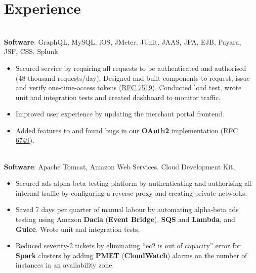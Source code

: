 \section{Experience}
\\
\textbf{Software}: GraphQL, MySQL, iOS, JMeter, JUnit, JAAS, JPA, EJB, Payara, JSF, CSS, Splunk

\begin{itemize}[leftmargin=*]
    \item {
        Secured service by requiring all requests to be authenticated and authorised (48 thousand requests/day). Designed and built components to request, issue and verify one-time-access tokens (\href{https://datatracker.ietf.org/doc/html/rfc7519}{RFC 7519}). Conducted load test, wrote unit and integration tests and created dashboard to monitor traffic.
    }
    \item {
        Improved user experience by updating the merchant portal frontend.
    }
    \item {
        Added features to and found bugs in our \textbf{OAuth2} implementation (\href{https://datatracker.ietf.org/doc/html/rfc6749}{RFC 6749}).
    }
\end{itemize}

\\
\textbf{Software}: Apache Tomcat, Amazon Web Services, Cloud Development Kit, 

\begin{itemize}[leftmargin=*]
    \item {
        Secured ads alpha-beta testing platform by authenticating and authorising all internal traffic by configuring a reverse-proxy and creating private networks.
    }
    \item {
        Saved 7 days per quarter of manual labour by automating alpha-beta ads testing using Amazon \textbf{Dacia} (\textbf{Event Bridge}), \textbf{SQS} and \textbf{Lambda}, and \textbf{Guice}. Wrote unit and integration tests.
    }
    \item {
        Reduced severity-2 tickets by eliminating “ec2 is out of capacity” error for \textbf{Spark} clusters by adding \textbf{PMET} (\textbf{CloudWatch}) alarms on the number of instances in an availability zone.
    }
\end{itemize}

